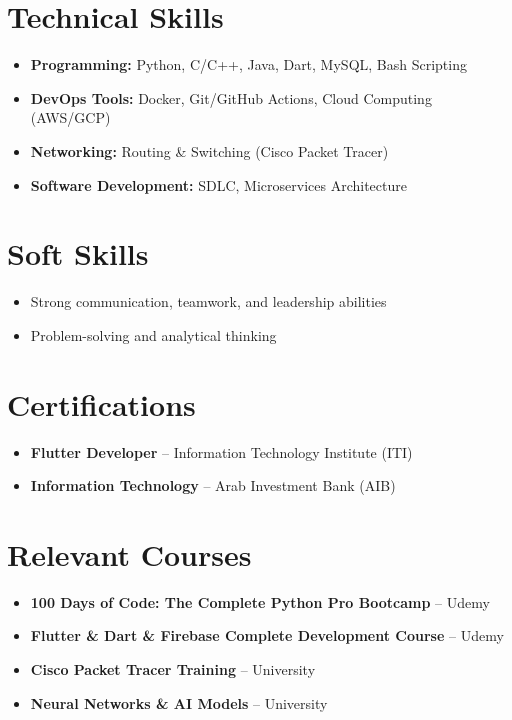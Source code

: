\documentclass[letterpaper,10.5pt]{article}
\begin{document}
\section{Technical Skills}
\begin{itemize}[leftmargin=*]
    \item \textbf{Programming:} Python, C/C++, Java, Dart, MySQL, Bash Scripting
    \item \textbf{DevOps Tools:} Docker, Git/GitHub Actions, Cloud Computing (AWS/GCP)
    \item \textbf{Networking:} Routing \& Switching (Cisco Packet Tracer)
    \item \textbf{Software Development:} SDLC, Microservices Architecture
\end{itemize}

\section{Soft Skills}
\begin{itemize}[leftmargin=*]
    \item Strong communication, teamwork, and leadership abilities
    \item Problem-solving and analytical thinking
\end{itemize}

\section{Certifications}
\begin{itemize}[leftmargin=*]
    \item \textbf{Flutter Developer} – Information Technology Institute (ITI)
    \item \textbf{Information Technology} – Arab Investment Bank (AIB)
\end{itemize}

\section{Relevant Courses}
\begin{itemize}[leftmargin=*]
    \item \textbf{100 Days of Code: The Complete Python Pro Bootcamp} – Udemy
    \item \textbf{Flutter \& Dart \& Firebase Complete Development Course} – Udemy
    \item \textbf{Cisco Packet Tracer Training} – University
    \item \textbf{Neural Networks \& AI Models} – University
\end{itemize}
\end{document}
